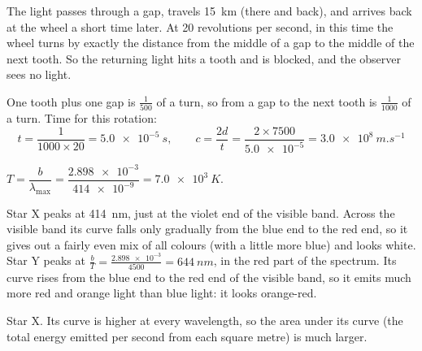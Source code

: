 \documentclass[12pt]{article}
\begin{document}
\ansq
{}
\begin{crit}
\end{crit}
\sample
The light passes through a gap, travels \qty{15}{km} (there and back), and arrives back at the wheel a
short time later. At 20 revolutions per second, in this time the wheel turns by exactly the distance from
the middle of a gap to the middle of the next tooth. So the returning light hits a tooth and is blocked,
and the observer sees no light.
\begin{crit}
\end{crit}
\sample
One tooth plus one gap is $\frac{1}{500}$ of a turn, so from a gap to the next tooth is $\frac{1}{1000}$
of a turn. Time for this rotation:
\[ t = \frac{1}{1000 \times 20} = \qty{5.0e-5}{s}, \qquad
   c = \frac{2d}{t} = \frac{2 \times 7500}{\num{5.0e-5}} = \qty{3.0e8}{m.s^{-1}} \]

\ansq
{}
\begin{crit}
\end{crit}
\sample
$T = \dfrac{b}{\lambda_\mathrm{max}} = \dfrac{\num{2.898e-3}}{\num{414e-9}} = \qty{7.0e3}{K}$.
\begin{crit}
\end{crit}
\sample
Star X peaks at \qty{414}{nm}, just at the violet end of the visible band. Across the visible band its
curve falls only gradually from the blue end to the red end, so it gives out a fairly even mix of all
colours (with a little more blue) and looks white. Star Y peaks at
$\frac{b}{T} = \frac{\num{2.898e-3}}{4500} = \qty{644}{nm}$, in the red part of the spectrum. Its curve rises
from the blue end to the red end of the visible band, so it emits much more red and orange light than
blue light: it looks orange-red.
\begin{crit}
\end{crit}
\sample
Star X. Its curve is higher at every wavelength, so the area under its curve (the total energy emitted
per second from each square metre) is much larger.
\end{document}
